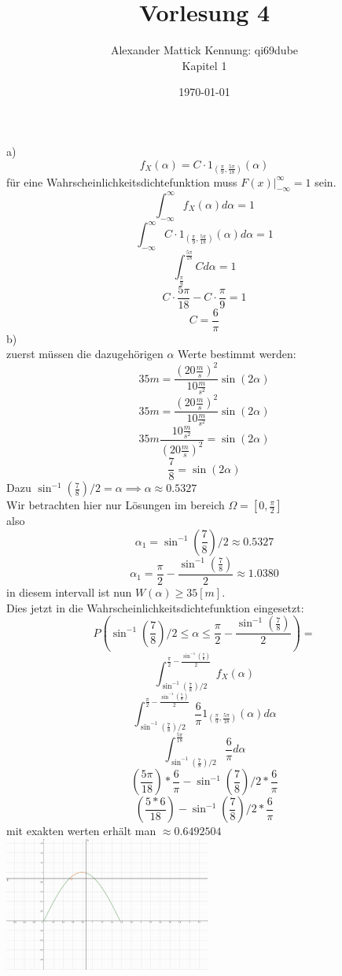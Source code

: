 \documentclass{article}
\author{
Alexander Mattick Kennung: qi69dube\\
Kapitel 1
}
\date{\today}
\title{Vorlesung 4}
\begin{document}
	\maketitle
	a)\\
	\[f_X(\alpha) = C\cdot 1_{(\frac{\pi}{9},\frac{5\pi}{18})}(\alpha)\]
	für eine Wahrscheinlichkeitsdichtefunktion muss $F(x)|_{-\infty}^{\infty}=1$ sein.\\
	\[\int^\infty_{-\infty}f_X(\alpha)d\alpha= 1\]
	\[\int^\infty_{-\infty}C\cdot 1_{(\frac{\pi}{9},\frac{5\pi}{18})}(\alpha)d\alpha=1\]
	\[\int^{\frac{5\pi}{18}}_{\frac{\pi}{9}}Cd\alpha=1\]
	\[C\cdot \frac{5\pi}{18}-C\cdot\frac{\pi}{9}=1\]
	\[C=\frac{6}{\pi}\]
	b)\\
	zuerst müssen die dazugehörigen $\alpha$ Werte bestimmt werden:\\
	\[35m = \frac{(20\frac{m}{s})^2}{10\frac{m}{s^2}}\sin(2\alpha)\]
	\[35m = \frac{(20\frac{m}{s})^2}{10\frac{m}{s^2}}\sin(2\alpha)\]
	\[35m\frac{10\frac{m}{s^2}}{(20\frac{m}{s})^2} = \sin(2\alpha)\]
	\[\frac{7}{8} = \sin(2\alpha)\]
	Dazu $\sin^{-1}(\frac{7}{8})/2=\alpha\implies \alpha\approx 0.5327$\\
	Wir betrachten hier nur Lösungen im bereich $\Omega = [0,\frac{\pi}{2}]$\\
	also
	\[\alpha_1 = \sin^{-1}(\frac{7}{8})/2\approx 0.5327\]
	\[\alpha_1 = \frac{\pi}{2}-\frac{\sin^{-1}(\frac{7}{8})}{2}\approx 1.0380\]
	in diesem intervall ist nun $W(\alpha)\geq 35[m]$.\\
	Dies jetzt in die Wahrscheinlichkeitsdichtefunktion eingesetzt:
	\[P(\sin^{-1}(\frac{7}{8})/2\leq \alpha\leq\frac{\pi}{2}-\frac{\sin^{-1}(\frac{7}{8})}{2})=\]
	\[\int^{\frac{\pi}{2}-\frac{\sin^{-1}(\frac{7}{8})}{2}}_{\sin^{-1}(\frac{7}{8})/2}f_X(\alpha)\]
	\[\int^{\frac{\pi}{2}-\frac{\sin^{-1}(\frac{7}{8})}{2}}_{\sin^{-1}(\frac{7}{8})/2}\frac{6}{\pi}1_{(\frac{\pi}{9},\frac{5\pi}{18})}(\alpha)d\alpha\]
	\[\int^{\frac{5\pi}{18}}_{\sin^{-1}(\frac{7}{8})/2}\frac{6}{\pi}d\alpha\]
	\[(\frac{5\pi}{18})*\frac{6}{\pi}-\sin^{-1}(\frac{7}{8})/2*\frac{6}{\pi}\]
	\[(\frac{5*6}{18})-\sin^{-1}(\frac{7}{8})/2*\frac{6}{\pi}\]
	mit exakten werten erhält man $\approx 0.6492504$\\
	\includegraphics[width=256px]{SPs.png}\\
\end{document}
